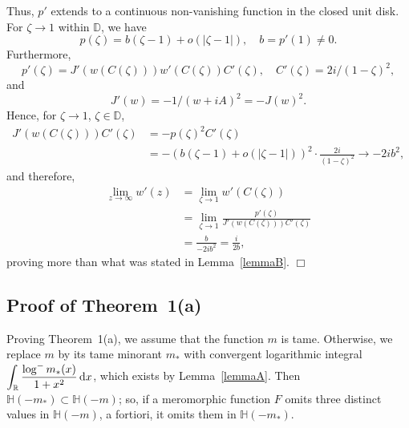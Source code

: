 \documentclass[12pt]{paper}
\newcommand{\bR}{\mathbb R}
\newcommand{\bD}{\mathbb D}
\newcommand{\bH}{\mathbb H}
\begin{document}
Thus, $p'$ extends to a continuous non-vanishing function in the closed unit disk.
For $\zeta\to 1$ within $\bD$, we have
\[
p(\zeta) = b(\zeta-1) + o(|\zeta-1|), \quad b=p'(1)\ne 0.
\] 
Furthermore, 
\[
p'(\zeta) = J'(w(C(\zeta))) w'(C(\zeta)) C'(\zeta), \quad C'(\zeta) = 2i/(1-\zeta)^2,
\] 
and
\[
J'(w) = -1/(w+iA)^2 = - J(w)^2.
\] 
Hence, for $\zeta\to 1$, $\zeta\in \bD$, 
\begin{align*}
J'(w(C(\zeta))) C'(\zeta) &= - p(\zeta)^2 C'(\zeta) \\
&= - (b(\zeta-1)+o(|\zeta-1|))^2 
\cdot \frac{2i}{(1-\zeta)^2} \to -2ib^2,
\end{align*}
and therefore,
\begin{align*}
\lim_{z\to\infty} w'(z) &= \lim_{\zeta\to 1} w'(C(\zeta)) \\
&=\lim_{\zeta\to 1} \frac{p'(\zeta)}{J'(w(C(\zeta))) C'(\zeta)} \\
&= \frac{b}{-2ib^2} = \frac{i}{2b},
\end{align*}
proving more than what was stated in Lemma~\ref{lemmaB}. \hfill $\Box$



\subsection{Proof of Theorem~1(a)}
Proving Theorem~1(a), we assume that the function $m$ is tame. Otherwise, we replace $m$ by its tame minorant 
$m_*$ with convergent logarithmic integral $\displaystyle \int_\bR \frac{\log^- m_*(x)}{1+x^2}\, {\rm d}x$, 
which exists by Lemma~\ref{lemmaA}. 
Then $\bH(-m_*)\subset \bH(-m)$; so, if a meromorphic function 
$F$ omits three distinct values in $\bH(-m)$, a fortiori,  it omits them in $\bH(-m_*)$.
\end{document}
